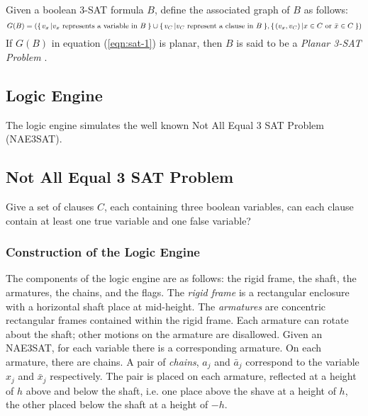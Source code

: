 \begin{definition}\label{def:Satisfiability-2}
Given a boolean 3-SAT formula $B$, define the associated graph of $B$ as follows:  
\begin{equation}\label{eqn:sat-1}
G(B) = \left({\left\lbrace \left. v_x \left\vert v_x\text{ represents a variable in }B \right.\right.\right\rbrace } \cup {\left\lbrace \left. v_C \left\vert v_C\text{ represent a 
clause in }B \right.\right.\right\rbrace }  , {\left\lbrace \left. \left( v_x, v_C\right)  \left\vert x \in C \text{ or } \bar{x} \in C \right.\right.\right\rbrace }  \right) 
\end{equation} 
If $G(B)$ in equation (\ref{eqn:sat-1}) is planar, then $B$ is said to be a \textit{Planar 3-SAT 
Problem} \cite{mulzer2008minimum}.
\subsection{Logic Engine}
The logic engine simulates the well known Not All Equal 3 SAT Problem (NAE3SAT).  
\subsection{Not All Equal 3 SAT Problem}
\begin{prob}\label{prob:Satisfiability-2}%
Give a set of clauses $C$, each containing three boolean variables, can each clause contain at 
least one true variable and one false variable?
\end{prob}
\subsubsection{Construction of the Logic Engine}
The components of the logic engine are as follows: the rigid frame, the shaft, the armatures, 
the chains, and the flags.  The \textit{rigid frame} is a rectangular enclosure with a horizontal 
shaft place at mid-height.  The \textit{armatures} are concentric rectangular frames contained 
within the rigid frame.  Each armature can rotate about the shaft; other motions on the armature 
are disallowed.  Given an NAE3SAT, for each variable there is a corresponding armature. On each 
armature, there are chains.  A pair of \textit{chains}, $a_j$ and $\bar{a}_j$ correspond to the 
variable $x_j$ and $\bar{x}_j$ respectively.  The pair is placed on each armature, reflected at a 
height of $h$ above and below the shaft, i.e. one place above the shave at a height of $h$, the 
other placed below the shaft at a height of $-h$.


\end{definition}
